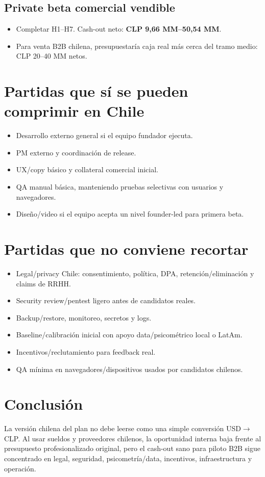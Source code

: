 \documentclass[11pt,a4paper]{article}
\begin{document}
\subsection{Private beta comercial vendible}
\begin{itemize}
\item Completar H1--H7. Cash-out neto: \textbf{CLP 9,66 MM--50,54 MM}.

\item Para venta B2B chilena, presupuestaría caja real más cerca del tramo medio: CLP 20--40 MM netos.
\end{itemize}

\section{Partidas que sí se pueden comprimir en Chile}
\begin{itemize}
  \item Desarrollo externo general si el equipo fundador ejecuta.
  \item PM externo y coordinación de release.
  \item UX/copy básico y collateral comercial inicial.
  \item QA manual básica, manteniendo pruebas selectivas con usuarios y navegadores.
  \item Diseño/video si el equipo acepta un nivel founder-led para primera beta.
\end{itemize}

\section{Partidas que no conviene recortar}
\begin{itemize}
  \item Legal/privacy Chile: consentimiento, política, DPA, retención/eliminación y claims de RRHH.
  \item Security review/pentest ligero antes de candidatos reales.
  \item Backup/restore, monitoreo, secretos y logs.
  \item Baseline/calibración inicial con apoyo data/psicométrico local o LatAm.
  \item Incentivos/reclutamiento para feedback real.
  \item QA mínima en navegadores/dispositivos usados por candidatos chilenos.
\end{itemize}

\section{Conclusión}
La versión chilena del plan no debe leerse como una simple conversión USD$\to$CLP. Al usar sueldos y proveedores chilenos, la oportunidad interna baja frente al presupuesto profesionalizado original, pero el cash-out sano para piloto B2B sigue concentrado en legal, seguridad, psicometría/data, incentivos, infraestructura y operación.
\end{document}
